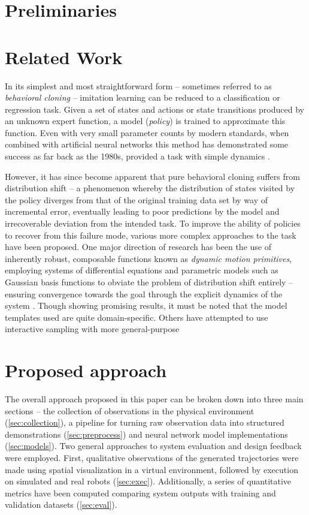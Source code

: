 \documentclass{article}
\begin{document}
\section{Preliminaries}
\label{sec:prelim}



\section{Related Work}
\label{sec:related}

In its simplest and most straightforward form -- sometimes referred to as \emph{behavioral cloning} -- imitation learning can be reduced to a classification or regression task. Given a set of states and actions or state transitions produced by an unknown expert function, a model (\emph{policy}) is trained to approximate this function. Even with very small parameter counts by modern standards, when combined with artificial neural networks this method has demonstrated some success as far back as the 1980s, provided a task with simple dynamics \citep{pomerleau1989alvinn}.

However, it has since become apparent that pure behavioral cloning suffers from distribution shift -- a phenomenon whereby the distribution of states visited by the policy diverges from that of the original training data set by way of incremental error, eventually leading to poor predictions by the model and irrecoverable deviation from the intended task. To improve the ability of policies to recover from this failure mode, various more complex approaches to the task have been proposed. One major direction of research has been the use of inherently robust, composable functions known as \emph{dynamic motion primitives}, employing systems of differential equations and parametric models such as Gaussian basis functions to obviate the problem of distribution shift entirely -- ensuring convergence towards the goal through the explicit dynamics of the system \citep{pastor2009learning}. Though showing promising results, it must be noted that the model templates used are quite domain-specific. Others have attempted to use interactive sampling with more general-purpose 



\section{Proposed approach}

The overall approach proposed in this paper can be broken down into three main sections -- the collection of observations in the physical environment (\ref{sec:collection}), a pipeline for turning raw observation data into structured demonstrations (\ref{sec:preprocess}) and neural network model implementations (\ref{sec:models}). Two general approaches to system evaluation and design feedback were employed. First, qualitative observations of the generated trajectories were made using spatial visualization in a virtual environment, followed by execution on simulated and real robots (\ref{sec:exec}). Additionally, a series of quantitative metrics have been computed comparing system outputs with training and validation datasets (\ref{sec:eval}).
\end{document}
